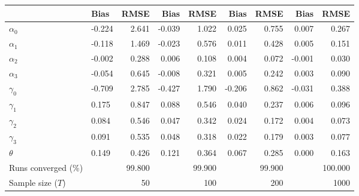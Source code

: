 
\begin{tabular}[t]{llrrrrrrr}
\toprule
  & Bias & RMSE & Bias & RMSE & Bias & RMSE & Bias & RMSE\\
\midrule
$\alpha_{0}$ & -0.224 & 2.641 & -0.039 & 1.022 & 0.025 & 0.755 & 0.007 & 0.267\\
$\alpha_{1}$ & -0.118 & 1.469 & -0.023 & 0.576 & 0.011 & 0.428 & 0.005 & 0.151\\
$\alpha_{2}$ & -0.002 & 0.288 & 0.006 & 0.108 & 0.004 & 0.072 & -0.001 & 0.030\\
$\alpha_{3}$ & -0.054 & 0.645 & -0.008 & 0.321 & 0.005 & 0.242 & 0.003 & 0.090\\
$\gamma_{0}$ & -0.709 & 2.785 & -0.427 & 1.790 & -0.206 & 0.862 & -0.031 & 0.388\\
$\gamma_{1}$ & 0.175 & 0.847 & 0.088 & 0.546 & 0.040 & 0.237 & 0.006 & 0.096\\
$\gamma_{2}$ & 0.084 & 0.546 & 0.047 & 0.342 & 0.024 & 0.172 & 0.004 & 0.073\\
$\gamma_{3}$ & 0.091 & 0.535 & 0.048 & 0.318 & 0.022 & 0.179 & 0.003 & 0.077\\
$\theta$ & 0.149 & 0.426 & 0.121 & 0.364 & 0.067 & 0.285 & 0.000 & 0.163\\
Runs converged (\%) &  & 99.800 &  & 99.900 &  & 99.900 &  & 100.000\\
Sample size ($T$) &  & 50 &  & 100 &  & 200 &  & 1000\\
\bottomrule
\end{tabular}
